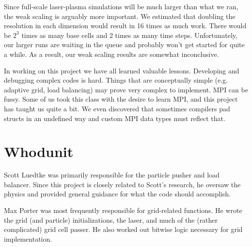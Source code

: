 \documentclass[]{article}
\begin{document}
Since full-scale laser-plasma simulations will be much larger than what we ran, the weak scaling is arguably more important.  We estimated that doubling the resolution in each dimension would result in 16 times as much work.  There would be  $2^3$ times as many base cells and 2 times as many time steps.  Unfortunately, our larger runs are waiting in the queue and probably won't get started for quite a while.  As a result, our weak scaling results are somewhat inconclusive.

In working on this project we have all learned valuable lessons.  Developing and debugging complex codes is hard.  Things that are conceptually simple (e.g. adaptive grid, load balancing) may prove very complex to implement.  MPI can be fussy.  Some of us took this class with the desire to learn MPI, and this project has taught us quite a bit.  We even discovered that sometimes compilers pad structs in an undefined way and custom MPI data types must reflect that.

\section{Whodunit}
Scott Luedtke was primarily responsible for the particle pusher and load balancer.  Since this project is closely related to Scott's research, he oversaw the physics and provided general guidance for what the code should accomplish.

Max Porter was most frequently responsible for grid-related functions. He wrote the grid (and particle) initializations, the laser, and much of the (rather complicated) grid cell passer. He also worked out bitwise logic necessary for grid implementation.
\end{document}
